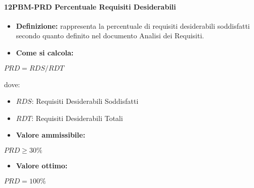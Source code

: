 \paragraph*{12PBM-PRD Percentuale Requisiti Desiderabili}
\begin{itemize}
    \item \textbf{Definizione:} rappresenta la percentuale di requisiti desiderabili soddisfatti secondo quanto definito nel documento Analisi dei Requisiti.
    \item \textbf{Come si calcola:}
\end{itemize}
\begin{center}
   $PRD = RDS/RDT$ 
\end{center}
dove:
\begin{itemize}[label=$\rightarrow$]
    \item $RDS$: Requisiti Desiderabili Soddisfatti
    \item $RDT$: Requisiti Desiderabili Totali
\end{itemize}
\begin{itemize}
    \item \textbf{Valore ammissibile:}
\end{itemize}
\begin{center}
    $PRD \geq 30\%$
\end{center}
\begin{itemize}
    \item \textbf{Valore ottimo:}
\end{itemize}
\begin{center}
    $PRD = 100\%$
\end{center}

